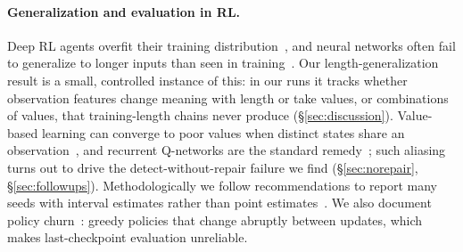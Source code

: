 \paragraph{Generalization and evaluation in RL.}
Deep RL agents overfit their training distribution~\citep{cobbe2019quantifying,kirk2023survey}, and neural networks often fail to generalize to longer inputs than seen in training~\citep{anil2022length,deletang2023chomsky}. Our length-generalization result is a small, controlled instance of this: in our runs it tracks whether observation features change meaning with length or take values, or combinations of values, that training-length chains never produce (\S\ref{sec:discussion}). Value-based learning can converge to poor values when distinct states share an observation~\citep{whitehead1991learning,singh1994learning,mccallum1996reinforcement}, and recurrent Q-networks are the standard remedy~\citep{hausknecht2015deep}; such aliasing turns out to drive the detect-without-repair failure we find (\S\ref{sec:norepair}, \S\ref{sec:followups}). Methodologically we follow recommendations to report many seeds with interval estimates rather than point estimates~\citep{henderson2018matters,agarwal2021precipice}. We also document policy churn~\citep{schaul2022churn}: greedy policies that change abruptly between updates, which makes last-checkpoint evaluation unreliable.
